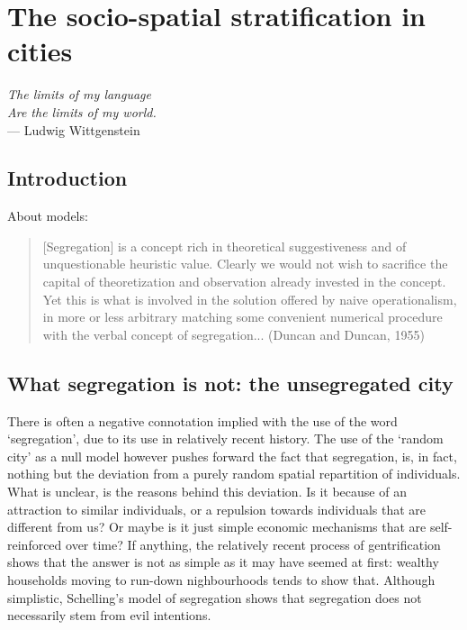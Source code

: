 %
\chapter{The socio-spatial stratification in cities}
\label{sec:concepts}


\begin{flushright}{\slshape    
The limits of my language\\
Are the limits of my world.} \\ \medskip
--- Ludwig Wittgenstein 
\end{flushright}

\section{Introduction}
\label{sec:introduction}

About models: \cite{Gauvin:2013, Brueckner:1999, Glaeser:2008}

\begin{quote}
    [Segregation] is a concept rich in theoretical suggestiveness and of
    unquestionable heuristic value. Clearly we would not wish to sacrifice the
    capital of theoretization and observation already invested in the concept.
    Yet this is what is involved in the solution offered by naive
    operationalism, in more or less arbitrary matching some convenient numerical
    procedure with the verbal concept of segregation... (Duncan and Duncan, 1955)
\end{quote}

\section{What segregation is not: the unsegregated city}
\label{sec:null_model_the_unsegregated_city}

There is often a negative connotation implied with the use of the word
`segregation', due to its use in relatively recent history. The use of the
`random city' as a null model however pushes forward the fact that segregation,
is, in fact, nothing but the deviation from a purely random spatial repartition
of individuals. What is unclear, is the reasons behind this deviation. Is it
because of an attraction to similar individuals, or a repulsion towards
individuals that are different from us? Or maybe is it just simple economic
mechanisms that are self-reinforced over time? If anything, the relatively
recent process of gentrification shows that the answer is not as simple as it
may have seemed at first: wealthy households moving to run-down nighbourhoods
tends to show that. Although
simplistic, Schelling's model of segregation shows that segregation does not
necessarily stem from evil intentions.

